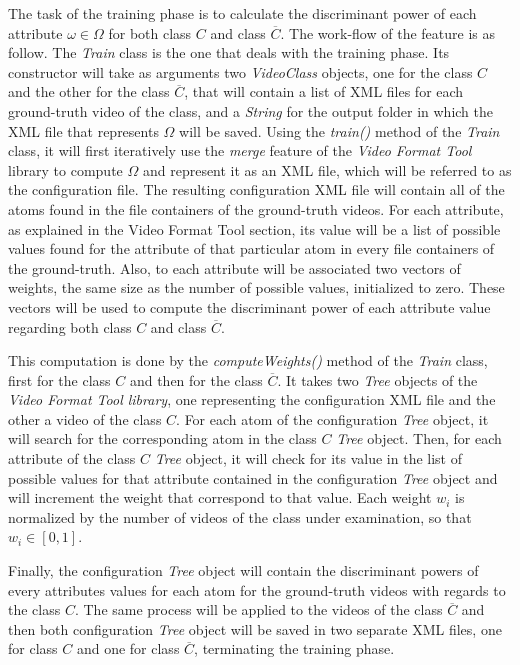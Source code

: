 The task of the training phase is to calculate the discriminant power of each attribute $\omega \in \Omega$ for both class $C$ and class $\overline{C}$. The work-flow of the feature is as follow. The \emph{Train} class is the one that deals with the training phase. Its constructor will take as arguments two \emph{VideoClass} objects, one for the class $C$ and the other for the class $\overline{C}$, that will contain a list of XML files for each ground-truth video of the class, and a \emph{String} for the output folder in which the XML file that represents $\Omega$ will be saved.
Using the \emph{train()} method of the \emph{Train} class, it will first iteratively use the \emph{merge} feature of the \emph{Video Format Tool} library to compute $\Omega$ and represent it as an XML file, which will be referred to as the configuration file. The resulting configuration XML file will contain all of the atoms found in the file containers of the ground-truth videos. For each attribute, as explained in the Video Format Tool section, its value will be a list of possible values found for the attribute of that particular atom in every file containers of the ground-truth. Also, to each attribute will be associated two vectors of weights, the same size as the number of possible values, initialized to zero. These vectors will be used to compute the discriminant power of each attribute value regarding both class $C$ and class $\overline{C}$.

This computation is done by the \emph{computeWeights()} method of the \emph{Train} class, first for the class $C$ and then for the class $\overline{C}$. It takes two \emph{Tree} objects of the \emph{Video Format Tool library}, one representing the configuration XML file and the other a video of the class $C$. For each atom of the configuration \emph{Tree} object, it will search for the corresponding atom in the class $C$ \emph{Tree} object. Then, for each attribute of the class $C$ \emph{Tree} object, it will check for its value in the list of possible values for that attribute contained in the configuration \emph{Tree} object and will increment the weight that correspond to that value. Each weight $w_{i}$ is normalized by the number of videos of the class under examination, so that $w_{i} \in \left[0, 1\right] $.

Finally, the configuration \emph{Tree} object will contain the discriminant powers of every attributes values for each atom for the ground-truth videos with regards to the class $C$. The same process will be applied to the videos of the class $\overline{C}$ and then both configuration \emph{Tree} object will be saved in two separate XML files, one for class $C$ and one for class $\overline{C}$, terminating the training phase.


